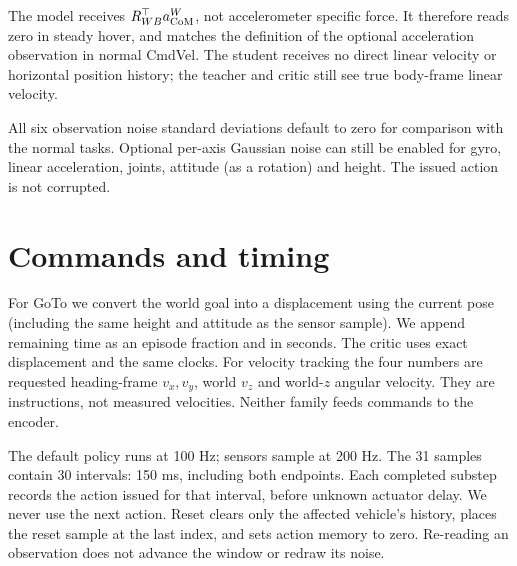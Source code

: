 \documentclass[10pt,a4paper,twocolumn]{article}
\begin{document}
The model receives $R_{WB}^{\top}a_{\rm CoM}^W$, not accelerometer specific force. It therefore reads zero in steady hover, and matches the definition of the optional acceleration observation in normal CmdVel. The student receives no direct linear velocity or horizontal position history; the teacher and critic still see true body-frame linear velocity.

All six observation noise standard deviations default to zero for comparison with the normal tasks. Optional per-axis Gaussian noise can still be enabled for gyro, linear acceleration, joints, attitude (as a rotation) and height. The issued action is not corrupted.

\section*{Commands and timing}
For GoTo we convert the world goal into a displacement using the current pose (including the same height and attitude as the sensor sample). We append remaining time as an episode fraction and in seconds. The critic uses exact displacement and the same clocks. For velocity tracking the four numbers are requested heading-frame $v_x,v_y$, world $v_z$ and world-$z$ angular velocity. They are instructions, not measured velocities. Neither family feeds commands to the encoder.

The default policy runs at 100 Hz; sensors sample at 200 Hz. The 31 samples contain 30 intervals: 150 ms, including both endpoints. Each completed substep records the action issued for that interval, before unknown actuator delay. We never use the next action. Reset clears only the affected vehicle's history, places the reset sample at the last index, and sets action memory to zero. Re-reading an observation does not advance the window or redraw its noise.
\end{document}
